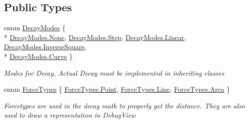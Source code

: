\subsection*{Public Types}
\begin{DoxyCompactItemize}
\item 
enum \hyperlink{class_farseer_physics_1_1_controllers_1_1_abstract_force_controller_aa49b5aa364a7f2f8a51af67437adabe0}{Decay\+Modes} \{ \\*
\hyperlink{class_farseer_physics_1_1_controllers_1_1_abstract_force_controller_aa49b5aa364a7f2f8a51af67437adabe0a6adf97f83acf6453d4a6a4b1070f3754}{Decay\+Modes.\+None}, 
\hyperlink{class_farseer_physics_1_1_controllers_1_1_abstract_force_controller_aa49b5aa364a7f2f8a51af67437adabe0a48c7c41b72e1d678923ce3571aa65b2d}{Decay\+Modes.\+Step}, 
\hyperlink{class_farseer_physics_1_1_controllers_1_1_abstract_force_controller_aa49b5aa364a7f2f8a51af67437adabe0a32a843da6ea40ab3b17a3421ccdf671b}{Decay\+Modes.\+Linear}, 
\hyperlink{class_farseer_physics_1_1_controllers_1_1_abstract_force_controller_aa49b5aa364a7f2f8a51af67437adabe0ace3511fe6e3cab696c0e1a62d445cd01}{Decay\+Modes.\+Inverse\+Square}, 
\\*
\hyperlink{class_farseer_physics_1_1_controllers_1_1_abstract_force_controller_aa49b5aa364a7f2f8a51af67437adabe0a2cb4d4a3f8dacd623fa045a44febd476}{Decay\+Modes.\+Curve}
 \}
\begin{DoxyCompactList}\small\item\em Modes for Decay. Actual Decay must be implemented in inheriting classes \end{DoxyCompactList}\item 
enum \hyperlink{class_farseer_physics_1_1_controllers_1_1_abstract_force_controller_a2bff9fa57e321530b860a86672a608a1}{Force\+Types} \{ \hyperlink{class_farseer_physics_1_1_controllers_1_1_abstract_force_controller_a2bff9fa57e321530b860a86672a608a1a2a3cd5946cfd317eb99c3d32e35e2d4c}{Force\+Types.\+Point}, 
\hyperlink{class_farseer_physics_1_1_controllers_1_1_abstract_force_controller_a2bff9fa57e321530b860a86672a608a1a4803e6b9e63dabf04de980788d6a13c4}{Force\+Types.\+Line}, 
\hyperlink{class_farseer_physics_1_1_controllers_1_1_abstract_force_controller_a2bff9fa57e321530b860a86672a608a1adeec4ff19974f12ed781cb9a59064214}{Force\+Types.\+Area}
 \}
\begin{DoxyCompactList}\small\item\em Forcetypes are used in the decay math to properly get the distance. They are also used to draw a representation in Debug\+View \end{DoxyCompactList}\item 

\end{DoxyCompactItemize}
